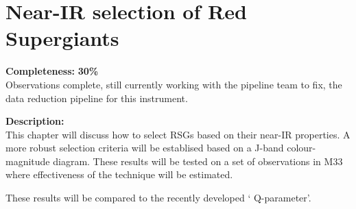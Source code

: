 \chapter{Near-IR selection of Red Supergiants}

\textbf{Completeness:} \textbf{30\%} \\
Observations complete, still currently working with the pipeline team to fix,
the data reduction pipeline for this instrument.

\textbf{Description:} \\
This chapter will discuss how to select RSGs based on their near-IR properties.
A more robust selection criteria will be establised based on a J-band colour-
magnitude diagram.
These results will be tested on a set of observations in M33 where effectiveness
of the technique will be estimated.

These results will be compared to the recently developed \textquoteleft
Q-parameter\textquoteright.
